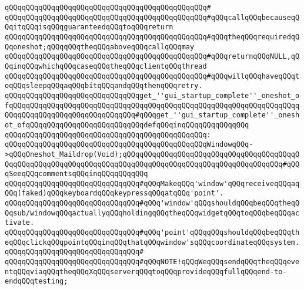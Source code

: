 \verb|qQQqqQQqqQQqqQQqqQQqqQQqqQQqqQQqqQQqqQQqqQQqqQQq#|\newline
\verb|qQQqqQQqqQQqqQQqqQQqqQQqqQQqqQQqqQQqqQQqqQQqqQQq#qQQqcallqQQqbecauseqQQqitqQQqisqQQqguaranteedqQQqtoqQQqreturn|\newline
\verb|qQQqqQQqqQQqqQQqqQQqqQQqqQQqqQQqqQQqqQQqqQQqqQQq#qQQqtheqQQqrequiredqQQqoneshot;qQQqqQQqtheqQQqaboveqQQqcallqQQqmay|\newline
\verb|qQQqqQQqqQQqqQQqqQQqqQQqqQQqqQQqqQQqqQQqqQQqqQQq#qQQqreturnqQQqNULL,qQQqinqQQqwhichqQQqcaseqQQqtheqQQqclientqQQqthread|\newline
\verb|qQQqqQQqqQQqqQQqqQQqqQQqqQQqqQQqqQQqqQQqqQQqqQQq#qQQqwillqQQqhaveqQQqtoqQQqsleepqQQqaqQQqbitqQQqandqQQqthenqQQqretry.|\newline
\newline
\verb|qQQqqQQqqQQqqQQqqQQqqQQqqQQqqQQqget_''gui_startup_complete''_oneshot_ofqQQqqQQqqQQqqQQqqQQqqQQqqQQqqQQqqQQqqQQqqQQqqQQqqQQqqQQqqQQqqQQqqQQqqQQqqQQqqQQqqQQqqQQqqQQqqQQqqQQq#qQQqget_''gui_startup_complete''_oneshot_ofqQQqqQQqqQQqqQQqqQQqqQQqqQQqdefqQQqinqQQqqQQqqQQqqQQq|\newline
\verb|qQQqqQQqqQQqqQQqqQQqqQQqqQQqqQQqqQQqqQQqqQQqqQQq:|\newline
\verb|qQQqqQQqqQQqqQQqqQQqqQQqqQQqqQQqqQQqqQQqqQQqqQQqWindowqQQq->qQQqOneshot_Maildrop(Void);qQQqqQQqqQQqqQQqqQQqqQQqqQQqqQQqqQQqqQQqqQQqqQQqqQQqqQQqqQQqqQQqqQQqqQQqqQQqqQQqqQQqqQQqqQQqqQQqqQQqqQQqqQQq#qQQqSeeqQQqcommentsqQQqinqQQqqQQqqQQq|\newline
\newline
\newline
\verb|qQQqqQQqqQQqqQQqqQQqqQQqqQQqqQQq#qQQqMakeqQQq'window'qQQqreceiveqQQqaqQQq(faked)qQQqkeyboardqQQqkeypressqQQqatqQQq'point'.|\newline
\verb|qQQqqQQqqQQqqQQqqQQqqQQqqQQqqQQq#qQQq'window'qQQqshouldqQQqbeqQQqtheqQQqsub/windowqQQqactuallyqQQqholdingqQQqtheqQQqwidgetqQQqtoqQQqbeqQQqactivate.|\newline
\verb|qQQqqQQqqQQqqQQqqQQqqQQqqQQqqQQq#qQQq'point'qQQqqQQqshouldqQQqbeqQQqtheqQQqclickqQQqpointqQQqinqQQqthatqQQqwindow'sqQQqcoordinateqQQqsystem.|\newline
\verb|qQQqqQQqqQQqqQQqqQQqqQQqqQQqqQQq#|\newline
\verb|qQQqqQQqqQQqqQQqqQQqqQQqqQQqqQQq#qQQqNOTE!qQQqWeqQQqsendqQQqtheqQQqeventqQQqviaqQQqtheqQQqXqQQqserverqQQqtoqQQqprovideqQQqfullqQQqend-to-endqQQqtesting;|\newline
